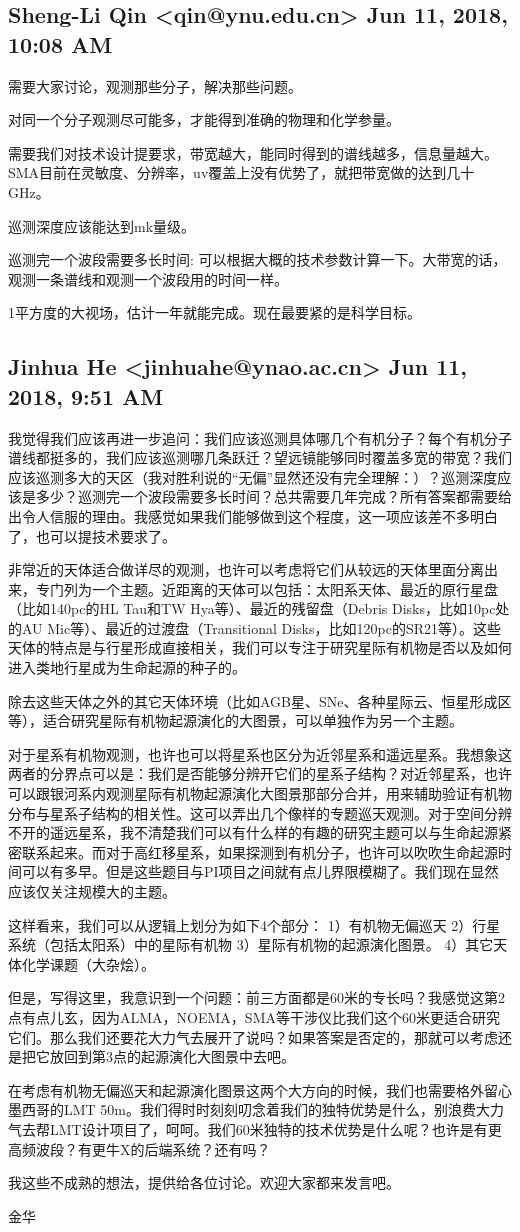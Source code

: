 \documentclass{article}
\newcommand\from[2]{\subsection{{#1} {#2}}}
\newcommand\said[1]{#1}
\begin{document}
\from{Sheng-Li Qin <qin@ynu.edu.cn>}{
Jun 11, 2018, 10:08 AM}
\said{
需要大家讨论，观测那些分子，解决那些问题。

对同一个分子观测尽可能多，才能得到准确的物理和化学参量。

需要我们对技术设计提要求，带宽越大，能同时得到的谱线越多，信息量越大。SMA目前在灵敏度、分辨率，uv覆盖上没有优势了，就把带宽做的达到几十GHz。

巡测深度应该能达到mk量级。

巡测完一个波段需要多长时间: 可以根据大概的技术参数计算一下。大带宽的话，观测一条谱线和观测一个波段用的时间一样。

1平方度的大视场，估计一年就能完成。现在最要紧的是科学目标。
}

\from{Jinhua He <jinhuahe@ynao.ac.cn>}{Jun 11, 2018, 9:51 AM}
\said{
我觉得我们应该再进一步追问：我们应该巡测具体哪几个有机分子？每个有机分子谱线都挺多的，我们应该巡测哪几条跃迁？望远镜能够同时覆盖多宽的带宽？我们应该巡测多大的天区（我对胜利说的“无偏”显然还没有完全理解：）？巡测深度应该是多少？巡测完一个波段需要多长时间？总共需要几年完成？所有答案都需要给出令人信服的理由。我感觉如果我们能够做到这个程度，这一项应该差不多明白了，也可以提技术要求了。

非常近的天体适合做详尽的观测，也许可以考虑将它们从较远的天体里面分离出来，专门列为一个主题。近距离的天体可以包括：太阳系天体、最近的原行星盘（比如140pc的HL Tau和TW Hya等）、最近的残留盘（Debris Disks，比如10pc处的AU Mic等）、最近的过渡盘（Transitional Disks，比如120pc的SR21等）。这些天体的特点是与行星形成直接相关，我们可以专注于研究星际有机物是否以及如何进入类地行星成为生命起源的种子的。

除去这些天体之外的其它天体环境（比如AGB星、SNe、各种星际云、恒星形成区等），适合研究星际有机物起源演化的大图景，可以单独作为另一个主题。

对于星系有机物观测，也许也可以将星系也区分为近邻星系和遥远星系。我想象这两者的分界点可以是：我们是否能够分辨开它们的星系子结构？对近邻星系，也许可以跟银河系内观测星际有机物起源演化大图景那部分合并，用来辅助验证有机物分布与星系子结构的相关性。这可以弄出几个像样的专题巡天观测。对于空间分辨不开的遥远星系，我不清楚我们可以有什么样的有趣的研究主题可以与生命起源紧密联系起来。而对于高红移星系，如果探测到有机分子，也许可以吹吹生命起源时间可以有多早。但是这些题目与PI项目之间就有点儿界限模糊了。我们现在显然应该仅关注规模大的主题。

这样看来，我们可以从逻辑上划分为如下4个部分：
1）有机物无偏巡天
2）行星系统（包括太阳系）中的星际有机物
3）星际有机物的起源演化图景。
4）其它天体化学课题（大杂烩）。

但是，写得这里，我意识到一个问题：前三方面都是60米的专长吗？我感觉这第2点有点儿玄，因为ALMA，NOEMA，SMA等干涉仪比我们这个60米更适合研究它们。那么我们还要花大力气去展开了说吗？如果答案是否定的，那就可以考虑还是把它放回到第3点的起源演化大图景中去吧。

在考虑有机物无偏巡天和起源演化图景这两个大方向的时候，我们也需要格外留心墨西哥的LMT 50m。我们得时时刻刻叨念着我们的独特优势是什么，别浪费大力气去帮LMT设计项目了，呵呵。我们60米独特的技术优势是什么呢？也许是有更高频波段？有更牛X的后端系统？还有吗？

我这些不成熟的想法，提供给各位讨论。欢迎大家都来发言吧。

金华
}
\end{document}
